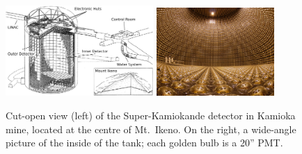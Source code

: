 \begin{figure}
	\centering
	\includegraphics[width=0.50\textwidth]{pics/superk-schematic-tags.png}
	\hfill
	\includegraphics[width=0.40\textwidth]{pics/superk-internal.jpeg}
	\caption[View of the Super-Kamiokande detector]%
	{Cut-open view (left) of the Super-Kamiokande detector in Kamioka mine, %
	located at the centre of Mt.\ Ikeno.
	On the right, a wide-angle picture of the inside of the tank; each golden bulb is a 20'' PMT.}
	\label{fig:sk_scheme}
\end{figure}

